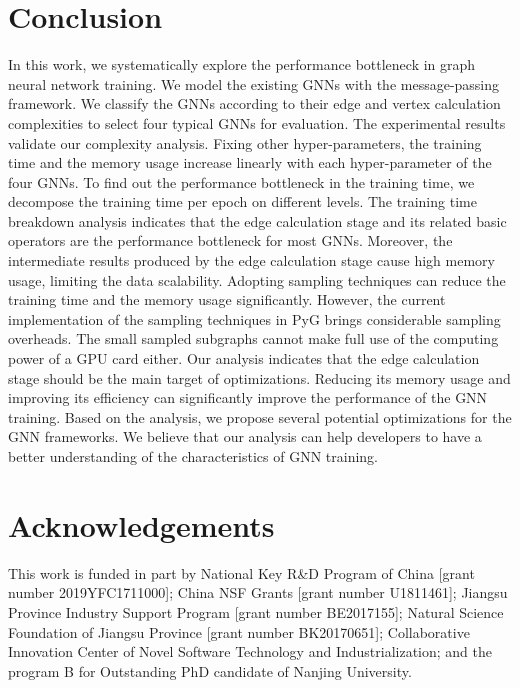 \section{Conclusion}
\label{sec:conclusion}

In this work, we systematically explore the performance bottleneck in graph neural network training. 
We model the existing GNNs with the message-passing framework. 
We classify the GNNs according to their edge and vertex calculation complexities to select four typical GNNs for evaluation. 
The experimental results validate our complexity analysis. Fixing other hyper-parameters, the training time and the memory usage increase linearly with each hyper-parameter of the four GNNs. 
To find out the performance bottleneck in the training time, we decompose the training time per epoch on different levels. 
The training time breakdown analysis indicates that the edge calculation stage and its related basic operators are the performance bottleneck for most GNNs. 
Moreover, the intermediate results produced by the edge calculation stage cause high memory usage, limiting the data scalability. 
Adopting sampling techniques can reduce the training time and the memory usage significantly. 
However, the current implementation of the sampling techniques in PyG brings considerable sampling overheads. 
The small sampled subgraphs cannot make full use of the computing power of a GPU card either. 
Our analysis indicates that the edge calculation stage should be the main target of optimizations. 
Reducing its memory usage and improving its efficiency can significantly improve the performance of the GNN training. 
Based on the analysis, we propose several potential optimizations for the GNN frameworks. 
We believe that our analysis can help developers to have a better understanding of the characteristics of GNN training.

\section*{Acknowledgements}

This work is funded in part by National Key R\&D Program of China [grant number 2019YFC1711000]; China NSF Grants [grant number U1811461]; Jiangsu Province Industry Support Program [grant number BE2017155]; Natural Science Foundation of Jiangsu Province [grant number BK20170651]; Collaborative Innovation Center of Novel Software Technology and Industrialization; and the program B for Outstanding PhD candidate of Nanjing University.
